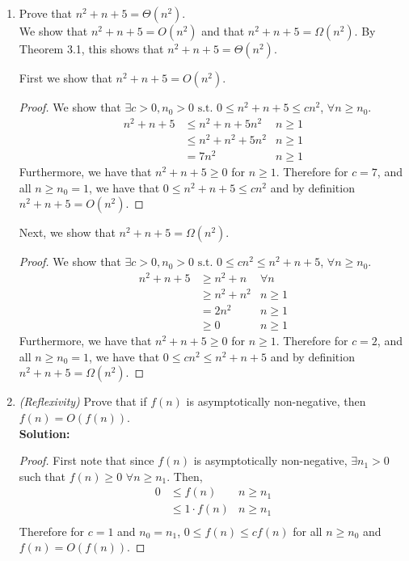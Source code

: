\documentclass[letterpaper,11pt]{article}
\begin{document}
\thispagestyle{plain}


 \\

 \\

\begin{enumerate}
\item Prove that $n^2 + n + 5 = \Theta(n^2)$.\\

We show that $n^2 + n + 5 = O(n^2)$ and that $n^2 + n + 5 = \Omega(n^2)$. By Theorem 3.1, this shows that $n^2 + n + 5 = \Theta(n^2)$.

First we show that $n^2 + n + 5 = O(n^2)$.
\begin{proof}
We show that $\exists c>0,n_0>0 \text{ s.t. } 0 \leq n^2 + n + 5 \leq cn^2$, $\forall n \geq n_0$.
\begin{align*}
n^2 + n + 5 &\leq n^2 + n + 5n^2&n\geq 1\\
            &\leq n^2 + n^2 + 5n^2&n\geq 1\\
            &=    7n^2&n\geq 1
\end{align*}
Furthermore, we have that $n^2 + n + 5 \geq 0$ for $n\geq 1$.
Therefore for $c=7$, and all $n\geq n_0=1$, we have that $0\leq n^2 + n + 5 \leq cn^2$ and by definition $n^2 + n + 5 = O(n^2)$.
\end{proof}

Next, we show that $n^2 + n + 5 = \Omega(n^2)$.
\begin{proof}
We show that $\exists c>0,n_0>0 \text{ s.t. } 0 \leq cn^2 \leq n^2 + n + 5$, $\forall n \geq n_0$.
\begin{align*}
n^2 + n + 5 &\geq n^2 + n & \forall n\\
            &\geq n^2 + n^2&n\geq 1\\
            &=    2n^2&n\geq 1\\
            &\geq 0 &n\geq 1
\end{align*}
Furthermore, we have that $n^2 + n + 5 \geq 0$ for $n\geq 1$.
Therefore for $c=2$, and all $n\geq n_0=1$, we have that $0\leq cn^2 \leq n^2 + n + 5$ and by definition $n^2 + n + 5 = \Omega(n^2)$.
\end{proof}
\item \emph{(Reflexivity)} Prove that if $f(n)$ is asymptotically non-negative, then $f(n) = O(f(n))$.\\
\textbf{Solution:}
\begin{proof}
First note that since $f(n)$ is asymptotically non-negative, $\exists n_1 > 0$ such that $f(n) \geq 0$ $\forall n\geq n_1$. Then,
\begin{align*}
0 &\leq f(n)& n \geq n_1\\
  &\leq 1\cdot f(n) & n \geq n_1\\
\end{align*}
Therefore for $c=1$ and $n_0=n_1$, $0\leq f(n) \leq cf(n)$ for all $n\geq n_0$ and $f(n) = O(f(n))$.
\end{proof}


\end{enumerate}
\end{document}
